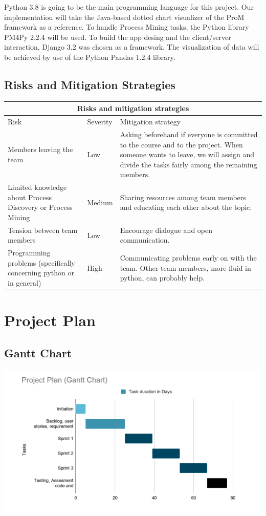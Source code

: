 \documentclass[a4paper,11pt]{scrartcl}
\begin{document}
Python 3.8 is going to be the main programming language for this project. Our implementation will take the Java-based dotted chart visualizer of the ProM framework as a reference. 
To handle Process Mining tasks, the Python library PM4Py 2.2.4 will be used. 
To build the app desing and the client/server interaction, Django 3.2 was chosen as a framework. 
The visualization of data will be achieved by use of the Python Pandas 1.2.4 library.

\subsection*{Risks and Mitigation Strategies}

\begin{tabular}{ |p{6cm}|p{1.5cm}|p{8cm}|  }
 \hline
 \multicolumn{3}{|c|}{Risks and mitigation strategies} \\
 \hline
 Risk & Severity & Mitigation strategy \\
 \hline
 Members leaving the team & Low & Asking beforehand if everyone is committed to the course and to the project. When someone wants to leave, we will assign and divide the tasks fairly among the remaining members.\\
  \hline
 Limited knowledge about Process Discovery or Process Mining &   Medium  & Sharing resources among team members and educating each other about the topic. \\
  \hline
 Tension between team members &Low & Encourage dialogue and open communication.\\
  \hline
 Programming problems (specifically concerning python or in general) & High & Communicating problems early on with the team. Other team-members, more fluid in python, can probably help.\\
 \hline
\end{tabular}

\section*{Project Plan}
\subsection*{Gantt Chart}

\includegraphics{Gantt}
\end{document}
